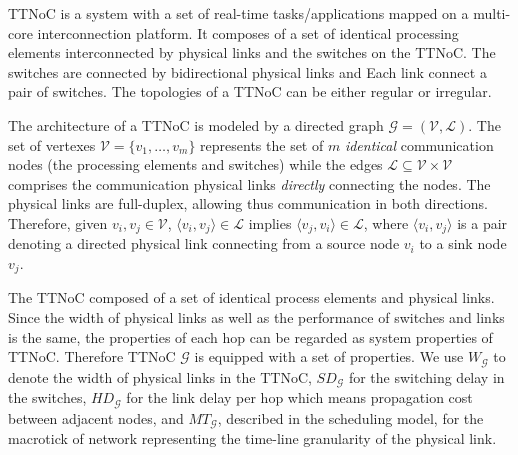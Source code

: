 \documentclass[journal]{IEEEtran}
\newcommand{\calG}{\mathcal{G}}
\newcommand{\calV}{\mathcal{V}}
\newcommand{\calL}{\mathcal{L}}
\newcommand{\width}{\mathit{W}_\calG}
\newcommand{\SD}{\mathit{SD}_\calG}
\newcommand{\HD}{\mathit{HD}_\calG}
\newcommand{\MT}{\mathit{MT}_\calG}
\begin{document}
TTNoC is a system with a set of real-time tasks/applications mapped on a multi-core interconnection platform.
It composes of a set of identical processing elements interconnected by physical links and the switches on the TTNoC. 
The switches are connected by bidirectional physical links and Each link connect a pair of switches.
The topologies of a TTNoC can be either regular or irregular.

The architecture of a TTNoC is
modeled by a directed graph $\calG=(\calV,\calL)$. The set of vertexes
$\mathcal{V}=\{ v_{1},\dots,v_{m}\}$ represents the set of $m$
\emph{identical} communication nodes (the processing elements and
switches) while the edges $\mathcal{L}\subseteq \mathcal{V} \times
\mathcal{V}$ comprises the communication physical links
\emph{directly} connecting the nodes.  The physical links are
full-duplex, allowing thus communication in both
directions. Therefore, given $v_i,v_j\in\calV$, $\langle
v_i,v_j\rangle \in\calL$ implies $\langle v_j,v_i\rangle\in\calL$,
where $\langle v_i,v_j\rangle$ is a pair denoting a directed physical
link connecting from a source node $v_i$ to a sink node $v_j$.

 
The TTNoC composed of a set of identical process elements and physical links.
Since the width of physical links as well as the performance of switches and links is the same, 
the properties of each hop can be regarded as system properties of TTNoC.
Therefore TTNoC $\calG$ is equipped with a set of properties.
We use $\width$
to denote the width of physical links in the TTNoC, $\SD$ for the
switching delay in the switches, $\HD$ for the link delay per hop
which means propagation cost between adjacent nodes, and $\MT$, 
described in the scheduling model, 
for the macrotick of network representing the time-line granularity of the
physical link.

\end{document}
